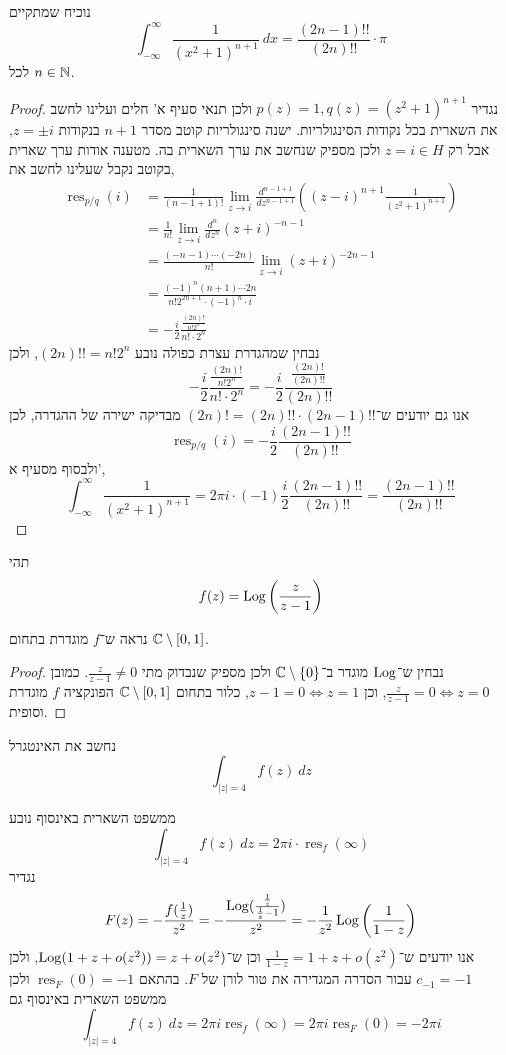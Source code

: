 \subquestion{}
נוכיח שמתקיים
\[
	\int_{-\infty}^{\infty} \frac{1}{{(x^2 + 1)}^{n + 1}}\ dx
	= \frac{(2n - 1)!!}{(2n)!!} \cdot \pi
\]
לכל $n \in \mathbb{N}$.
\begin{proof}
	נגדיר $p(z) = 1, q(z) = {(z^2 + 1)}^{n + 1}$ ולכן תנאי סעיף א' חלים ועלינו לחשב את השארית בכל נקודות הסינגולריות.
	ישנה סינגולריות קוטב מסדר $n + 1$ בנקודות $z = \pm i$, אבל רק $z = i \in H$ ולכן מספיק שנחשב את ערך השארית בה.
	מטענה אודות ערך שארית בקוטב נקבל שעלינו לחשב את,
	\begin{align*}
		\operatorname{res}_{p/q}(i)
		& = \frac{1}{(n - 1 + 1)!} \lim_{z \to i} \frac{d^{n - 1 + 1}}{dz^{n - 1 + 1}} \left({(z - i)}^{n + 1} \frac{1}{{(z^2 + 1)}^{n + 1}}\right) \\
		& = \frac{1}{n!} \lim_{z \to i} \frac{d^n}{dz^n} {(z + i)}^{-n - 1} \\
		& = \frac{(-n - 1) \cdots (-2n)}{n!} \lim_{z \to i} {(z + i)}^{-2n - 1} \\
		& = \frac{{(-1)}^n (n + 1) \cdots 2n}{n! 2^{2n + 1} \cdot {(-1)}^n \cdot i} \\
		& = -\frac{i}{2} \frac{\frac{(2n)!}{n! 2^n}}{n! \cdot 2^n}
	\end{align*}
	נבחין שמהגדרת עצרת כפולה נובע $(2n)!! = n! 2^n$, ולכן
	\[
		-\frac{i}{2} \frac{\frac{(2n)!}{n! 2^n}}{n! \cdot 2^n}
		= -\frac{i}{2} \frac{\frac{(2n)!}{(2n)!!}}{(2n)!!}
	\]
	אנו גם יודעים ש־$(2n)! = (2n)!! \cdot (2n - 1)!! $ מבדיקה ישירה של ההגדרה, לכן
	\[
		\operatorname{res}_{p/q}(i)
		= -\frac{i}{2} \frac{(2n - 1)!!}{(2n)!!}
	\]
	ולבסוף מסעיף א',
	\[
		\int_{-\infty}^{\infty} \frac{1}{{(x^2 + 1)}^{n + 1}}
		= 2 \pi i \cdot (-1) \frac{i}{2} \frac{(2n - 1)!!}{(2n)!!}
		= \frac{(2n - 1)!!}{(2n)!!}
	\]
\end{proof}

\question{}
תהי
\[
	f(z) = \operatorname{Log}\left(\frac{z}{z - 1}\right)
\]

\subquestion{}
נראה ש־$f$ מוגדרת בתחום $\mathbb{C} \setminus [0, 1]$.
\begin{proof}
	נבחין ש־$\operatorname{Log}$ מוגדר ב־$\mathbb{C} \setminus \{ 0 \}$ ולכן מספיק שנבדוק מתי $\frac{z}{z - 1} \ne 0$.
	כמובן $\frac{z}{z - 1} = 0 \iff z = 0$, וכן $z - 1 = 0 \iff z = 1$, כלור בתחום $\mathbb{C} \setminus [0, 1]$ הפונקציה $f$ מוגדרת וסופית.
\end{proof}

\subquestion{}
נחשב את האינטגרל
\[
	\int_{|z| = 4} f(z)\ dz
\]
\begin{solution}
	ממשפט השארית באינסוף נובע
	\[
		\int_{|z| = 4} f(z)\ dz
		= 2\pi i \cdot \operatorname{res}_f(\infty)
	\]
	נגדיר
	\[
		F(z)
		= -\frac{f(\frac{1}{z})}{z^2}
		= -\frac{\operatorname{Log}(\frac{\frac{1}{z}}{\frac{1}{z} - 1})}{z^2}
		= -\frac{1}{z^2} \operatorname{Log}\left(\frac{1}{1 - z}\right)
	\]
	אנו יודעים ש־$\frac{1}{1 - z} = 1 + z + o(z^2)$ וכן ש־$\operatorname{Log}(1 + z + o(z^2)) = z + o(z^2)$, ולכן $c_{-1} = -1$ עבור הסדרה המגדירה את טור לורן של $F$.
	בהתאם $\operatorname{res}_F(0) = -1$ ולכן ממשפט השארית באינסוף גם
	\[
		\int_{|z| = 4} f(z)\ dz
		= 2\pi i \operatorname{res}_f(\infty)
		= 2\pi i \operatorname{res}_F(0)
		= -2\pi i
	\]
\end{solution}

